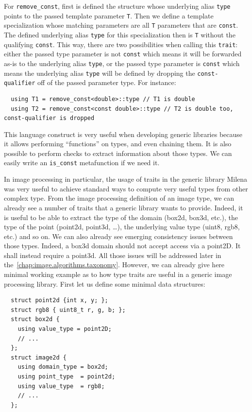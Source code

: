 For \texttt{remove\_const}, first is defined the structure whose underlying alias \texttt{type} points to the passed
template parameter \texttt{T}. Then we define a template specialization whose matching parameters are all \texttt{T}
parameters that are \texttt{const}. The defined underlying alias \texttt{type} for this specialization then is
\texttt{T} without the qualifying \texttt{const}. This way, there are two possibilities when calling this
\texttt{trait}: either the passed type parameter is not \texttt{const} which means it will be forwarded as-is to the
underlying alias \texttt{type}, or the passed type parameter is \texttt{const} which means the underlying alias
\texttt{type} will be defined by dropping the \texttt{const-qualifier} off of the passed parameter type. For instance:

\begin{verbatim}
  using T1 = remove_const<double>::type // T1 is double
  using T2 = remove_const<const double>::type // T2 is double too, const-qualifier is dropped
\end{verbatim}

This language construct is very useful when developing generic libraries because it allows performing ``functions'' on
types, and even chaining them. It is also possible to perform checks to extract information about those types. We can
easily write an \texttt{is\_const} metafunction if we need it.

In image processing in particular, the usage of traits in the generic library Milena was very useful to achieve standard
ways to compute very useful types from other complex type. From the image processing definition of an image type, we can
already see a number of traits that a generic library wants to provide. Indeed, it is useful to be able to extract the
type of the domain (box2d, box3d, etc.), the type of the point (point2d, point3d, \ldots), the underlying value type
(uint8, rgb8, etc.) and so on. We can also already see emerging consistency issues between those types. Indeed, a box3d
domain should not accept access via a point2D. It shall instead require a point3d. All those issues will be addressed
later in the~\cref{chap:image.algorithms.taxonomy}. However, we can already give here minimal working example as to how
type traits are useful in a generic image processing library. First let us define some minimal data structures:

\begin{verbatim}
  struct point2d {int x, y; };
  struct rgb8 { uint8_t r, g, b; };
  struct box2d {
    using value_type = point2D;
    // ...
  };
  struct image2d {
    using domain_type = box2d;
    using point_type  = point2d;
    using value_type  = rgb8;
    // ...
  };
\end{verbatim}

